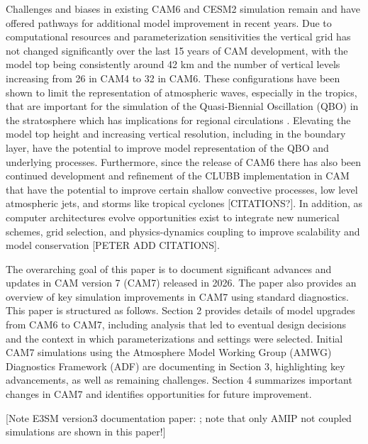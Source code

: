 \documentclass[draft]{agujournal2019}
\begin{document}
Challenges and biases in existing CAM6 and CESM2 simulation remain and have offered pathways for additional model improvement in recent years. Due to computational resources and parameterization sensitivities the vertical grid has not changed significantly over the last 15 years of CAM development, with the model top being consistently around 42 km and the number of vertical levels increasing from 26 in CAM4 to 32 in CAM6. These configurations have been shown to limit the representation of atmospheric waves, especially in the tropics, that are important for the simulation of the Quasi-Biennial Oscillation (QBO) in the stratosphere which has implications for regional circulations \cite{Simpson:2025}. Elevating the model top height and  increasing vertical resolution, including in the boundary layer, have the potential to improve model representation of the QBO and underlying processes. Furthermore, since the release of CAM6 there has also been continued development and refinement of the CLUBB implementation in CAM that have the potential to improve certain shallow convective processes, low level atmospheric jets, and storms like tropical cyclones [CITATIONS?].  In addition, as computer architectures evolve opportunities exist to integrate new numerical schemes, grid selection, and physics-dynamics coupling to improve scalability and model conservation [PETER ADD CITATIONS]. 

The overarching goal of this paper is to document significant advances and updates in CAM version 7 (CAM7) released in 2026. The paper also provides an overview of key simulation improvements in CAM7 using standard diagnostics. This paper is structured as follows.  Section 2 provides details of model upgrades from CAM6 to CAM7, including analysis that led to eventual design decisions and the context in which parameterizations and settings were selected. Initial CAM7 simulations using the Atmosphere Model Working Group (AMWG) Diagnostics Framework (ADF) are documenting in Section 3, highlighting key advancements, as well as remaining challenges. Section 4 summarizes important changes in CAM7 and identifies opportunities for future improvement. 

[Note E3SM version3 documentation paper: \cite{E3SMv3}; note that only AMIP not coupled simulations are shown in this paper!]
%

\end{document}
